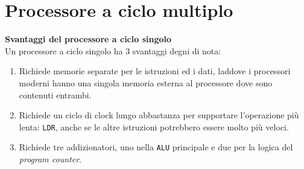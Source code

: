 





\section{Processore a ciclo multiplo}


\begin{note}
    \textbf{Svantaggi del processore a ciclo singolo} \\
    Un processore a ciclo singolo ha 3 svantaggi degni di nota:
    \begin{enumerate}
        \item Richiede memorie separate per le istruzioni ed i dati, laddove i processori
        moderni hanno una singola memoria esterna al processore dove sono contenuti entrambi.
        \item Richiede un ciclo di clock lungo abbastanza per supportare l'operazione più lenta: \texttt{LDR}, anche se le
        altre istruzioni potrebbero essere molto più veloci.
        \item Richiede tre addizionatori, uno nella \texttt{ALU} principale e due per la logica del \textit{program counter}.
    \end{enumerate}
\end{note}

